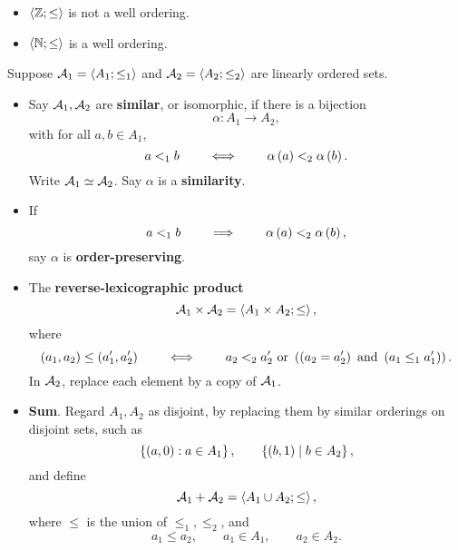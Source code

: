 \begin{example*}
\hfill
\begin{itemize}
\item $ \ab{\Z; \le} $ is not a well ordering.
\item $ \ab{\N; \le} $ is a well ordering.
\end{itemize}
\end{example*}


Suppose $ \AA_1 = \ab{A_1; \le_1} $ and $ \AA_2 = \ab{A_2; \le_2} $ are linearly ordered sets.

\begin{definition}
\hfill
\begin{itemize}
\item Say $ \AA_1, \AA_2 $ are \textbf{similar}, or isomorphic, if there is a bijection
$$ \alpha : A_1 \to A_2, $$
with for all $ a, b \in A_1 $,
$$ a <_1 b \qquad \iff \qquad \alpha\rb{a} <_2 \alpha\rb{b}. $$
Write $ \AA_1 \simeq \AA_2 $. Say $ \alpha $ is a \textbf{similarity}.
\item If
$$ a <_1 b \qquad \implies \qquad \alpha\rb{a} <_2 \alpha\rb{b}, $$
say $ \alpha $ is \textbf{order-preserving}.
\end{itemize}
\end{definition}

\begin{definition}
\hfill
\begin{itemize}
\item The \textbf{reverse-lexicographic product}
$$ \AA_1 \times \AA_2 = \ab{A_1 \times A_2; \le}, $$
where
$$ \rb{a_1, a_2} \le \rb{a_1', a_2'} \qquad \iff \qquad a_2 <_2 a_2' \ \text{or} \ \rb{\rb{a_2 = a_2'} \ \text{and} \ \rb{a_1 \le_1 a_1'}}. $$
In $ \AA_2 $, replace each element by a copy of $ \AA_1 $.
\item \textbf{Sum}. Regard $ A_1, A_2 $ as disjoint, by replacing them by similar orderings on disjoint sets, such as
$$ \cb{\rb{a, 0} : a \in A_1}, \qquad \cb{\rb{b, 1} \mid b \in A_2}, $$
and define
$$ \AA_1 + \AA_2 = \ab{A_1 \cup A_2; \le}, $$
where $ \le $ is the union of $ \le_1, \le_2 $, and
$$ a_1 \le a_2, \qquad a_1 \in A_1, \qquad a_2 \in A_2. $$
\end{itemize}
\end{definition}

